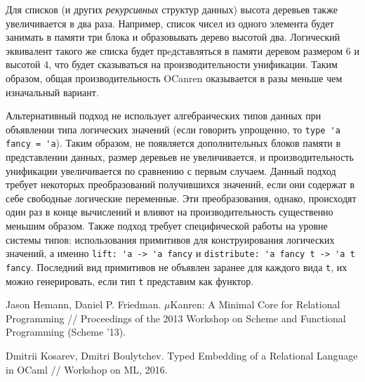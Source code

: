 \documentclass[10pt]{article}
\begin{document}

Для списков (и других \emph{рекурсивных} структур данных) высота деревьев также увеличивается в два раза. Например,
список чисел из одного элемента будет занимать в памяти три блока и образовывать дерево высотой два. Логический
эквивалент такого же списка будет прeдставляться в памяти деревом размером 6 и высотой 4, что будет сказываться 
на производительности унификации. Таким образом, общая производительность OCanren оказывается в разы меньше чем 
изначальный вариант.

Альтернативный подход не использует алгебраических типов данных при объявлении типа логических значений 
(если говорить упрощенно, то \verb|type 'a fancy = 'a|).
Таким образом, не появляется дополнительных блоков памяти в представлении данных, размер деревьев не увеличивается,
и производительность унификации увеличивается по сравнению с первым случаем. Данный подход требует некоторых преобразований 
получившихся значений, если они содержат в себе свободные логические переменные. Эти преобразования, однако, происходят один раз в конце 
вычислений и влияют на производительность существенно меньшим образом. Также подход требует специфической
работы на уровне системы типов: использования примитивов для конструирования логических значений, а именно 
\verb|lift: 'a -> 'a fancy| и \verb|distribute: 'a fancy t -> 'a t fancy|. Последний вид примитивов не объявлен заранее для каждого вида 
\verb|t|, их можно генерировать, если тип \verb|t| представим как функтор.

\begin{thebibliography}{99}

Jason Hemann, Daniel P. Friedman. $\mu$Kanren: A Minimal Core for Relational Programming //
Proceedings of the 2013 Workshop on Scheme and Functional Programming (Scheme '13).

Dmitrii Kosarev, Dmitri Boulytchev. Typed Embedding of a Relational Language in OCaml //
Workshop on ML, 2016.
 
\end{thebibliography}
\end{document}
